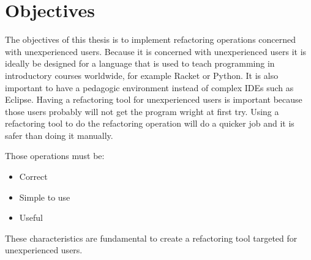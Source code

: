 
% 
% 

\section{Objectives}





The objectives of this thesis is to implement refactoring operations concerned with unexperienced users.
Because it is concerned with unexperienced users it is ideally be designed for a language that is used to teach programming in introductory courses worldwide, for example Racket or Python.
It is also important to have a pedagogic environment instead of complex IDEs such as Eclipse.
Having a refactoring tool for unexperienced users is important because those users probably will not get the program wright at first try.
Using a refactoring tool to do the refactoring operation will do a quicker job and it is safer than doing it manually.

Those operations must be:
\begin{itemize}
\item Correct
\item Simple to use
\item Useful
\end{itemize}

These characteristics are fundamental to create a refactoring tool targeted for unexperienced users.